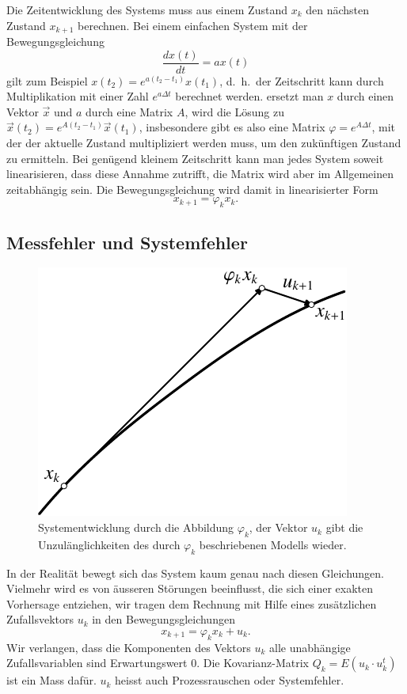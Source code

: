 Die Zeitentwicklung des Systems muss aus einem Zustand $x_k$ den nächsten
Zustand $x_{k+1}$ berechnen.
Bei einem
einfachen System mit der Bewegungsgleichung
\[
\frac{dx(t)}{dt}=ax(t)
\]
gilt zum Beispiel $x(t_2)=e^{a(t_2-t_1)}x(t_1)$, d.~h.~der Zeitschritt
kann durch Multiplikation mit einer Zahl $e^{a\Delta t}$ berechnet werden.
ersetzt man $x$ durch einen Vektor $\vec x$ und $a$ durch eine Matrix
$A$, wird die Lösung zu $\vec x(t_2)=e^{A(t_2-t_1)}\vec x(t_1)$,
insbesondere gibt es also eine Matrix $\varphi=e^{A\Delta t}$, mit
der der aktuelle Zustand multipliziert werden muss, um den zukünftigen
Zustand zu ermitteln.
Bei genügend kleinem Zeitschritt kann man jedes
System soweit linearisieren, dass diese Annahme zutrifft, die Matrix
wird aber im Allgemeinen zeitabhängig sein.
Die Bewegungsgleichung
wird damit in linearisierter Form
\[
x_{k+1}=\varphi_kx_k.
\]

\subsection{Messfehler und Systemfehler}
\begin{figure}
\centering
\includegraphics{images/filter-1.pdf}
\caption{Systementwicklung durch die Abbildung $\varphi_k$, der Vektor $u_k$
gibt die Unzulänglichkeiten des durch $\varphi_k$ beschriebenen Modells
wieder.
\label{filter-systementwicklung}}
\end{figure}
In der Realität bewegt sich das System kaum genau nach diesen Gleichungen.
Vielmehr wird es von äusseren Störungen beeinflusst, die sich einer
exakten Vorhersage entziehen, wir tragen dem Rechnung mit Hilfe eines
zusätzlichen Zufallsvektors $u_k$ in den Bewegungsgleichungen
\[
x_{k+1}=\varphi_kx_k+ u_k.
\]
Wir verlangen, dass die Komponenten des Vektors $u_k$ alle unabhängige
Zufallsvariablen sind Erwartungswert 0.
Die Kovarianz-Matrix $Q_k=E(u_k\cdot u_k^t)$ ist
ein Mass dafür.
$u_k$ heisst auch Prozessrauschen oder Systemfehler.

